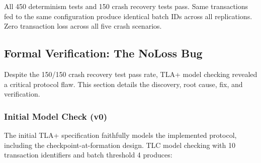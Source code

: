 \begin{table}[ht]
\centering
\caption{Determinism and Crash Recovery Test Results}
\label{tab:correctness}
\end{table}

All 450 determinism tests and 150 crash recovery tests pass. Same transactions
fed to the same configuration produce identical batch IDs across all
replications. Zero transaction loss across all five crash scenarios.

\subsection{Formal Verification: The NoLoss Bug}
\label{sec:noloss}

Despite the 150/150 crash recovery test pass rate, TLA+ model checking
revealed a critical protocol flaw. This section details the discovery,
root cause, fix, and verification.

\subsubsection{Initial Model Check (v0)}

The initial TLA+ specification faithfully models the implemented protocol,
including the checkpoint-at-formation design. TLC model checking with 10
transaction identifiers and batch threshold 4 produces:

